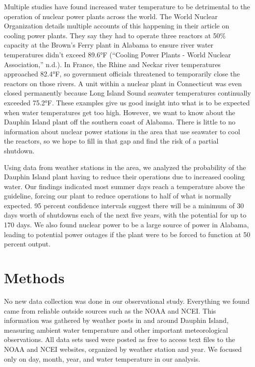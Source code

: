 \documentclass[
  letterpaper,
  DIV=11,
  numbers=noendperiod]{scrreprt}
\begin{document}
Multiple studies have found increased water temperature to be
detrimental to the operation of nuclear power plants across the world.
The World Nuclear Organization details multiple accounts of this
happening in their article on cooling power plants. They say they had to
operate three reactors at 50\% capacity at the Brown's Ferry plant in
Alabama to ensure river water temperatures didn't exceed 89.6°F
({``Cooling Power Plants - World Nuclear Association,''} n.d.). In
France, the Rhine and Neckar river temperatures approached 82.4°F, so
government officials threatened to temporarily close the reactors on
those rivers. A unit within a nuclear plant in Connecticut was even
closed permanently because Long Island Sound seawater temperatures
continually exceeded 75.2°F. These examples give us good insight into
what is to be expected when water temperatures get too high. However, we
want to know about the Dauphin Island plant off the southern coast of
Alabama. There is little to no information about nuclear power stations
in the area that use seawater to cool the reactors, so we hope to fill
in that gap and find the risk of a partial shutdown.

Using data from weather stations in the area, we analyzed the
probability of the Dauphin Island plant having to reduce their
operations due to increased cooling water. Our findings indicated most
summer days reach a temperature above the guideline, forcing our plant
to reduce operations to half of what is normally expected. 95 percent
confidence intervals suggest there will be a minimum of 30 days worth of
shutdowns each of the next five years, with the potential for up to 170
days. We also found nuclear power to be a large source of power in
Alabama, leading to potential power outages if the plant were to be
forced to function at 50 percent output.


\chapter{Methods}\label{methods-1}

No new data collection was done in our observational study. Everything
we found came from reliable outside sources such as the NOAA and NCEI.
This information was gathered by weather posts in and around Dauphin
Island, measuring ambient water temperature and other important
meteorological observations. All data sets used were posted as free to
access text files to the NOAA and NCEI websites, organized by weather
station and year. We focused only on day, month, year, and water
temperature in our analysis.
\end{document}
